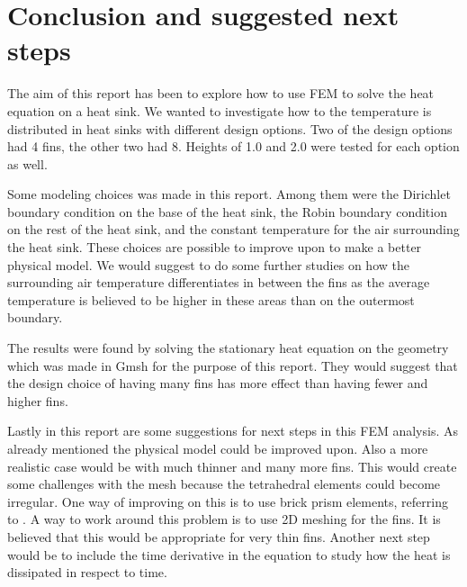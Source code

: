 \section{Conclusion and suggested next steps}
The aim of this report has been to explore how to use FEM to solve the heat equation on a heat sink. We wanted to investigate how to the temperature is distributed in heat sinks with different design options. Two of the design options had 4 fins, the other two had 8. Heights of 1.0 and 2.0 were tested for each option as well.

Some modeling choices was made in this report. Among them were the Dirichlet boundary condition on the base of the heat sink, the Robin boundary condition on the rest of the heat sink, and the constant temperature for the air surrounding the heat sink. These choices are possible to improve upon to make a better physical model. We would suggest to do some further studies on how the surrounding air temperature differentiates in between the fins as the average temperature is believed to be higher in these areas than on the outermost boundary. 

The results were found by solving the stationary heat equation on the geometry which was made in Gmsh for the purpose of this report. They would suggest that the design choice of having many fins has more effect than having fewer and higher fins.

Lastly in this report are some suggestions for next steps in this FEM analysis. As already mentioned the physical model could be improved upon. Also a more realistic case would be with much thinner and many more fins. This would create some challenges with the mesh because the tetrahedral elements could become irregular. One way of improving on this is to use brick prism elements, referring to \cite{comsol_mesh_types}. A way to work around this problem is to use 2D meshing for the fins. It is believed that this would be appropriate for very thin fins. Another next step would be to include the time derivative in the equation to study how the heat is dissipated in respect to time.